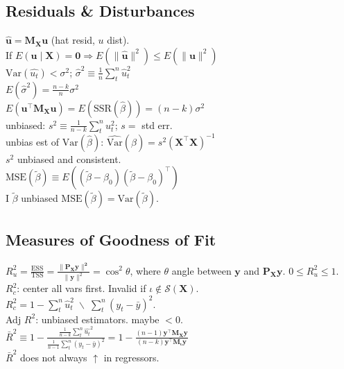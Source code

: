 \subsection*{Residuals \& Disturbances}
$\mathbf{\hat{u}} = \mathbf{M_X u}$ (hat resid, $u$ dist).\\
If $E(\mathbf{u}\mid \mathbf{X}) = \mathbf{0} \Rightarrow E(\lVert \mathbf{\hat{u}} \rVert ^2) \leq E(\lVert \mathbf{u} \rVert ^2)$\\
$\text{Var}(\hat{u_t}) < \sigma^2$; $\hat{\sigma}^2 \equiv \frac{1}{n} \sum_{t}^{n} \hat{u}_t ^2$\\
$E(\hat{\sigma}^2) = \frac{n-k}{n}\sigma^2$\\
$E(\mathbf{u^{\top}M_X u}) = E(\text{SSR}(\hat{\beta})) = (n-k)\sigma^2$\\
unbiased: $s^2 \equiv \frac{1}{n-k}\sum_{t}^{n} u_t ^2$; $s=$ std err.\\
unbias est of $\text{Var}(\hat{\beta})$: $\widehat{\text{Var}}(\hat{\beta})=s^2(\mathbf{X^{\top}X})^{-1}$\\
$s^2$ unbiased and consistent.\\
$\text{MSE}(\tilde{\beta}) \equiv E((\tilde{\beta} - \beta_0)(\tilde{\beta} - \beta_0)^{\top})$\\
I $\tilde{\beta}$ unbiased $\text{MSE}(\tilde{\beta}) = \text{Var}(\tilde{\beta})$.
\subsection*{Measures of Goodness of Fit}
$R_{u}^2 = \frac{\text{ESS}}{\text{TSS}}= \frac{\lVert \mathbf{P_X y \rVert^2}}{\lVert \mathbf{y} \rVert^2} = \cos^2 \theta$, where $\theta$ angle between $\mathbf{y}$ and $\mathbf{P_X y}$.
$0 \leq R^2_{u} \leq 1$.\\
$R_{c}^2$: center all vars first.
Invalid if $\iota \notin \mathcal{S}(\mathbf{X})$.\\
$R_{c}^2 = 1 - \sum_{t}^{n} \hat{u}_t ^2 \; \backslash \; \sum_{t}^{n} (y_t - \bar{y})^2$.\\
Adj $R^2$: unbiased estimators.
maybe $< 0$.\\
$\bar{R}^2 \equiv 1- \frac{\frac{1}{n-k}\sum_{t}^{n} \hat{u_t}^2}{\frac{1}{n-1}\sum_{t}^{n}(y_t - \bar{y})^2} = 1 - \frac{(n-1)\mathbf{y^{\top}M_X y}}{(n-k)\mathbf{y^{\top}M_\iota y}}$\\
$\bar{R}^2$ does not always $\uparrow$ in regressors.
